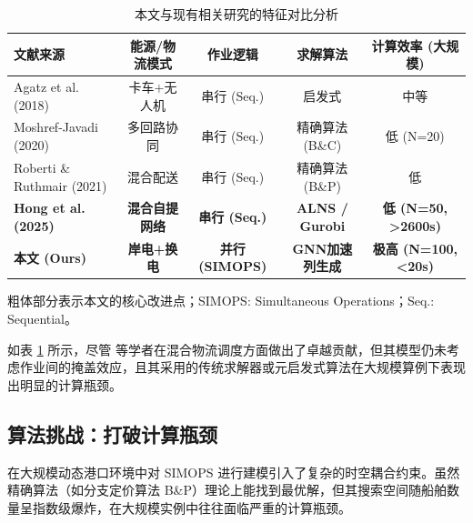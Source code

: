 \documentclass[UTF8, a4paper, 12pt]{ctexart}
\begin{document}
\begin{table}[htbp]
    \centering
    \caption{本文与现有相关研究的特征对比分析}
    \label{tab:lit_review}
    \footnotesize 
    \renewcommand{\arraystretch}{1.4} %
    \begin{threeparttable}
        \begin{tabular}{l c c c c}
            \toprule
            \textbf{文献来源} & \textbf{能源/物流模式} & \textbf{作业逻辑} & \textbf{求解算法} & \textbf{计算效率 (大规模)} \\
            \midrule
            Agatz et al. (2018) \cite{Agatz2018} & 卡车+无人机 & 串行 (Seq.) & 启发式 & 中等 \\
            Moshref-Javadi (2020) \cite{Moshref2020} & 多回路协同 & 串行 (Seq.) & 精确算法 (B\&C) & 低 (N=20) \\
            Roberti \& Ruthmair (2021) & 混合配送 & 串行 (Seq.) & 精确算法 (B\&P) & 低 \\
            \textbf{Hong et al. (2025)} \cite{Hong2025} & \textbf{混合自提网络} & \textbf{串行 (Seq.)} & \textbf{ALNS / Gurobi} & \textbf{低 (N=50, >2600s)} \\
            \midrule
            \rowcolor{gray!15} \textbf{本文 (Ours)} & \textbf{岸电+换电} & \textbf{并行 (SIMOPS)} & \textbf{GNN加速列生成} & \textbf{极高 (N=100, <20s)} \\
            \bottomrule
        \end{tabular}
        \begin{tablenotes}
            \item[注] 粗体部分表示本文的核心改进点；SIMOPS: Simultaneous Operations；Seq.: Sequential。
        \end{tablenotes}
    \end{threeparttable}
\end{table}

如表 \ref{tab:lit_review} 所示，尽管 \cite{Hong2025} 等学者在混合物流调度方面做出了卓越贡献，但其模型仍未考虑作业间的掩盖效应，且其采用的传统求解器或元启发式算法在大规模算例下表现出明显的计算瓶颈。

\subsection{算法挑战：打破计算瓶颈}
在大规模动态港口环境中对 SIMOPS 进行建模引入了复杂的时空耦合约束。虽然精确算法（如分支定价算法 B\&P）理论上能找到最优解，但其搜索空间随船舶数量呈指数级爆炸，在大规模实例中往往面临严重的计算瓶颈。
\end{document}
